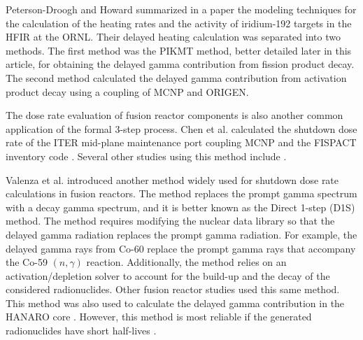 \documentclass{style/nseJournal}
\begin{document}
Peterson-Droogh and Howard \cite{peterson-droogh_current_2018} summarized in a paper the modeling techniques for the calculation of the heating rates and the activity of iridium-192 targets in the \gls*{HFIR} at the \gls*{ORNL}.
Their delayed heating calculation was separated into two methods.
The first method was the PIKMT method, better detailed later in this article, for obtaining the delayed gamma contribution from fission product decay.
The second method calculated the delayed gamma contribution from activation product decay using a coupling of MCNP and ORIGEN.

The dose rate evaluation of fusion reactor components is also another common application of the formal 3-step process.
Chen et al. \cite{chen_rigorous_2002} calculated the shutdown dose rate of the ITER mid-plane maintenance port coupling MCNP and the FISPACT inventory code \cite{forrest_fispact_1998}.
Several other studies using this method include \cite{serikov_advanced_2002, sauvan_development_2016}.

Valenza et al. \cite{valenza_proposal_2001} introduced another method widely used for shutdown dose rate calculations in fusion reactors.
The method replaces the prompt gamma spectrum with a decay gamma spectrum, and it is better known as the Direct 1-step (D1S) method.
The method requires modifying the nuclear data library so that the delayed gamma radiation replaces the prompt gamma radiation.
For example, the delayed gamma rays from Co-60 replace the prompt gamma rays that accompany the Co-59 $(n, \gamma)$ reaction.
Additionally, the method relies on an activation/depletion solver to account for the build-up and the decay of the considered radionuclides.
Other fusion reactor studies \cite{petrizzi_improvement_2001, palermo_shutdown_2017} used this same method.
This method was also used to calculate the delayed gamma contribution in the HANARO core \cite{noh_estimation_2018}.
However, this method is most reliable if the generated radionuclides have short half-lives \cite{noh_estimation_2018}.
\end{document}

